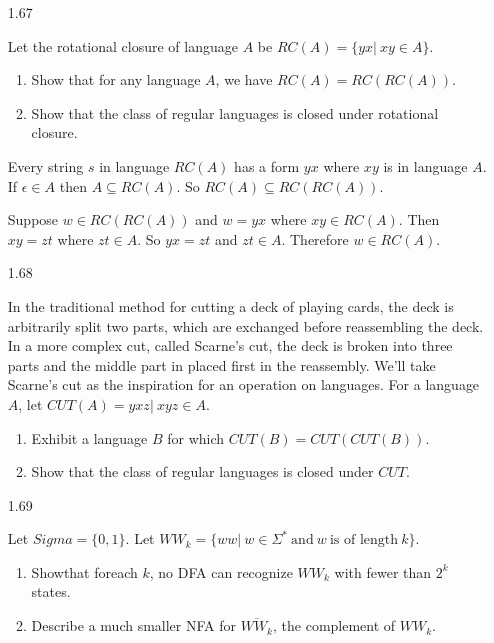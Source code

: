 \begin{enumerate}
      \item [1.67]
            
            Let the rotational closure of language $A$ be $RC(A)=\{yx|~ xy \in A\}$.
            \begin{enumerate}
                  \item Show that for any language $A$, we have $RC(A)=RC(RC(A))$.
                  \item Show that the class of regular languages is closed under rotational closure.
            \end{enumerate}
            
            Every string $s$ in language $RC(A)$ has a form $yx$ where $xy$ is in language $A$. 
            If $\epsilon \in A$ then $A \subseteq RC(A)$. So $RC(A) \subseteq RC(RC(A))$.

            Suppose $w \in RC(RC(A))$ and $w = yx$ where $xy \in RC(A)$. Then $xy = zt$ where $zt \in A$. So $yx = zt$ and $zt \in A$. Therefore $w \in RC(A)$.

            
      \item [1.68]
            
            In the traditional method for cutting a deck of playing cards, the deck is arbitrarily split two parts, which are exchanged before reassembling the deck. In a more complex cut, called Scarne’s cut, the deck is broken into three parts and the middle part in placed first in the reassembly. We’ll take Scarne’s cut as the inspiration for an operation on languages.
            For a language $A$, let $CUT(A)={yxz|~xyz \in A}$.
            \begin{enumerate}
                  \item Exhibit a language $B$ for which $CUT(B)= CUT(CUT(B))$.
                  \item Show that the class of regular languages is closed under $CUT$.
            \end{enumerate}
            
            
      \item [1.69]
            
            Let $Sigma=\{0,1\}$. Let $WW_k = \{ww|~ w \in \Sigma^\ast~ \text{and}~ w~ \text{is of length}~ k\}$.
            \begin{enumerate}
                  \item Showthat foreach $k$, no DFA can recognize $WW_k$ with fewer than $2^k$ states.
                  \item Describe a much smaller NFA for $\overline{WW_k}$, the complement of $WW_k$.
            \end{enumerate}
            
\end{enumerate}
